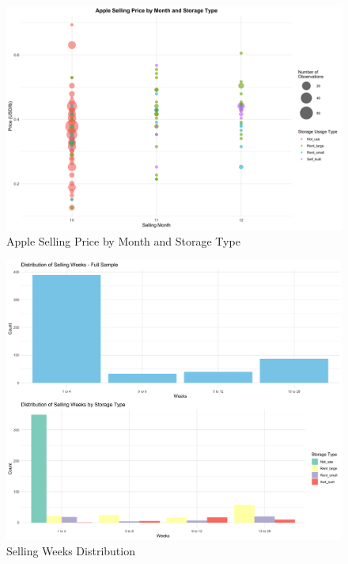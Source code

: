 \documentclass[12pt]{article}
\begin{document}
\begin{figure}[H]
\centering
\includegraphics[width=1\textwidth]{Figures/apple_price_bubble_plot.png}
\caption{Apple Selling Price by Month and Storage Type}
\label{Figure: selling price bubble}
\end{figure}

\begin{figure}[H]
\centering
\includegraphics[width=1\textwidth]{Figures/selling_weeks_distribution.png}
\caption{Selling Weeks Distribution}
\label{Figure: selling weeks distribution}
\end{figure}
\end{document}
